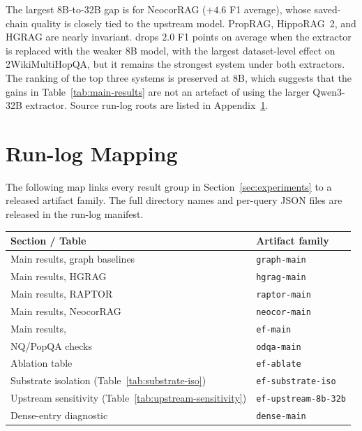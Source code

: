 The largest 8B-to-32B gap is for NeocorRAG ($+4.6$ F1 average), whose
saved-chain quality is closely tied to the upstream model. PropRAG,
HippoRAG~2, and HGRAG are nearly invariant. \methodname{} drops
$2.0$ F1 points on average when the extractor is replaced with the
weaker 8B model, with the largest dataset-level effect on
2WikiMultiHopQA, but it remains the strongest system under both
extractors. The ranking of the top three systems is preserved at 8B,
which suggests that the gains in Table~\ref{tab:main-results} are not
an artefact of using the larger Qwen3-32B extractor. Source run-log
roots are listed in Appendix~\ref{app:runlogs}.

\section{Run-log Mapping}
\label{app:runlogs}

The following map links every result group in
Section~\ref{sec:experiments} to a released artifact family. The full
directory names and per-query JSON files are released in the run-log
manifest.

\begin{center}
\centering
\small
\setlength{\tabcolsep}{5pt}
\begin{tabular}{ll}
\toprule
Section / Table & Artifact family \\
\midrule
Main results, graph baselines      & \texttt{graph-main} \\
Main results, HGRAG                & \texttt{hgrag-main} \\
Main results, RAPTOR               & \texttt{raptor-main} \\
Main results, NeocorRAG            & \texttt{neocor-main} \\
Main results, \methodname{}        & \texttt{ef-main} \\
NQ/PopQA checks                    & \texttt{odqa-main} \\
Ablation table                     & \texttt{ef-ablate} \\
Substrate isolation (Table~\ref{tab:substrate-iso})
                                   & \texttt{ef-substrate-iso} \\
Upstream sensitivity (Table~\ref{tab:upstream-sensitivity})
                                   & \texttt{ef-upstream-8b-32b} \\
Dense-entry diagnostic             & \texttt{dense-main} \\
\bottomrule
\end{tabular}
\end{center}
